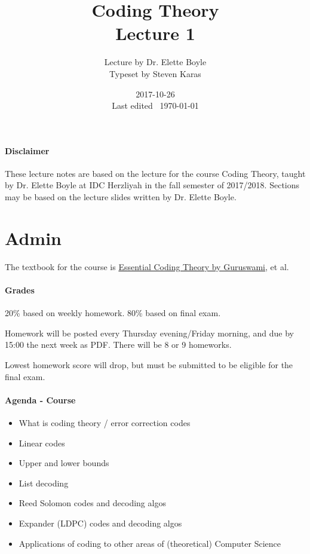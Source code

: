\documentclass{idc_msc}
\title{Coding Theory\\\large Lecture 1}
\date{2017-10-26 \\ Last edited \currenttime\ \today}
\author{Lecture by Dr. Elette Boyle\\Typeset by Steven Karas}
\begin{document}
\maketitle

\paragraph{Disclaimer}

These lecture notes are based on the lecture for the course Coding Theory, taught by Dr. Elette Boyle at IDC Herzliyah in the fall semester of 2017/2018.
Sections may be based on the lecture slides written by Dr. Elette Boyle.

\section{Admin}

The textbook for the course is \href{https://www.cse.buffalo.edu/faculty/atri/courses/coding-theory/book/}{Essential Coding Theory by Guruswami}, et al.

\paragraph{Grades}

20\% based on weekly homework.
80\% based on final exam.

Homework will be posted every Thursday evening/Friday morning, and due by 15:00 the next week as PDF.
There will be 8 or 9 homeworks.

Lowest homework score will drop, but must be submitted to be eligible for the final exam.

\paragraph{Agenda - Course}

\begin{itemize}
  \item What is coding theory / error correction codes
  \item Linear codes
  \item Upper and lower bounds
  \item List decoding
  \item Reed Solomon codes and decoding algos
  \item Expander (LDPC) codes and decoding algos
  \item Applications of coding to other areas of (theoretical) Computer Science
\end{itemize}
\end{document}
